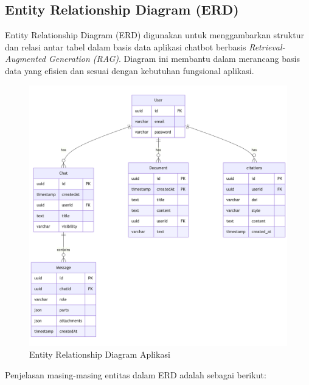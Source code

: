 \subsection{Entity Relationship Diagram (ERD)}

Entity Relationship Diagram (ERD) digunakan untuk menggambarkan struktur dan relasi antar tabel dalam basis data aplikasi chatbot berbasis \textit{Retrieval-Augmented Generation (RAG)}. Diagram ini membantu dalam merancang basis data yang efisien dan sesuai dengan kebutuhan fungsional aplikasi.

\begin{figure}[H]
  \centering
  \includegraphics[width=0.95\linewidth]{images/bab-3/erd-skripsi.png}
  \caption{Entity Relationship Diagram Aplikasi}
  \label{fig:erd}
\end{figure}

\noindent Penjelasan masing-masing entitas dalam ERD adalah sebagai berikut:

